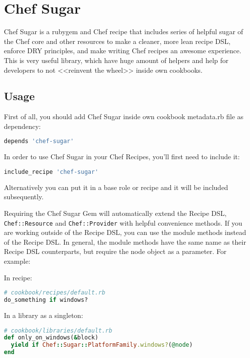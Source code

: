 \section{Chef Sugar}
\label{sec:tat-chef-sugar}

Chef Sugar is a rubygem and Chef recipe that includes series of helpful sugar of the Chef core and other resources to make a cleaner, more lean recipe DSL, enforce DRY principles, and make writing Chef recipes an awesome experience. This is very useful library, which have huge amount of helpers and help for developers to not <<reinvent the wheel>> inside own cookbooks.

\subsection{Usage}

First of all, you should add Chef Sugar inside own cookbook metadata.rb file as dependency:

\begin{lstlisting}[language=Ruby,label=lst:tat-chef-sugar1]
depends 'chef-sugar'
\end{lstlisting}

In order to use Chef Sugar in your Chef Recipes, you'll first need to include it:

\begin{lstlisting}[language=Ruby,label=lst:tat-chef-sugar2]
include_recipe 'chef-sugar'
\end{lstlisting}

Alternatively you can put it in a base role or recipe and it will be included subsequently.

Requiring the Chef Sugar Gem will automatically extend the Recipe DSL, \lstinline!Chef::Resource! and \lstinline!Chef::Provider! with helpful convenience methods. If you are working outside of the Recipe DSL, you can use the module methods instead of the Recipe DSL. In general, the module methods have the same name as their Recipe DSL counterparts, but require the node object as a parameter. For example:

In recipe:

\begin{lstlisting}[language=Ruby,label=lst:tat-chef-sugar3]
# cookbook/recipes/default.rb
do_something if windows?
\end{lstlisting}

In a library as a singleton:

\begin{lstlisting}[language=Ruby,label=lst:tat-chef-sugar4]
# cookbook/libraries/default.rb
def only_on_windows(&block)
  yield if Chef::Sugar::PlatformFamily.windows?(@node)
end
\end{lstlisting}

